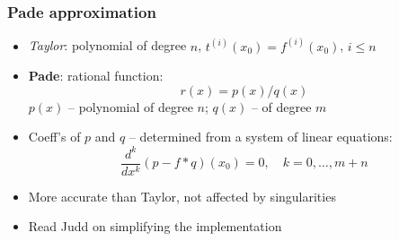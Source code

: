 \documentclass[bigger]{beamer}
\begin{document}
\begin{frame}%

\frametitle{Pade approximation}

\begin{itemize}
\item \emph{Taylor}: polynomial of degree $n$, $%
t^{(i)}(x_{0})=f^{(i)}(x_{0}) $, $i\leq n$

\item \textbf{Pade}: rational function:%
\begin{equation*}
r(x)=p(x)/q(x)
\end{equation*}%
$p(x)$ -- polynomial of degree $n$; $q(x)$ -- of degree $m$

\item Coeff's of $p$ and $q$ -- determined from a system of linear equations:%
\begin{equation*}
\frac{d^{k}}{dx^{k}}(p-f\ast q)(x_{0})=0,\quad k=0,\ldots ,m+n
\end{equation*}

\item More accurate than Taylor, not affected by singularities

\item Read Judd on simplifying the implementation
\end{itemize}

\end{frame}%
\end{document}
